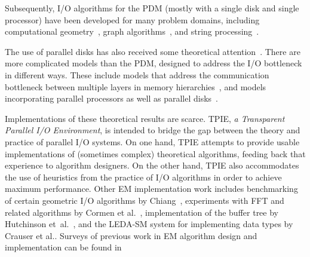 Subsequently, I/O algorithms for the PDM (mostly with a single disk
and single processor) have been developed for many problem domains,
including computational
geometry~\cite{aapv-fibld-01,goodrich:external,arge:buffer,arge:theory,arge:gis,aamvv-empgbtag97,arge:interval,kanellakis:indexing,ramaswamy:path,subramanian:p-range,vengroff:efficient,agarwal:efficient,zhu:further,agarwal:point,arge:scalable,arge:theory,callahan:topology,franciosa:orders,grossi:cross-tree,arge:tpie},
 graph
algorithms~\cite{chiang:external,arge:buffer,kumar:improved,abello:functional,crauser:randomized,arge:obdd,feuerstein:memory,nodine:blocking,ullman:input},
 and string
processing~\cite{ferragina:fully,ferragina:fast,arge:strings,crauser:construction}.

The use of parallel disks
 has also received some
theoretical
attention~\cite{vitter:parmem1,nodine:deterministic,nodine:greed,dehne:efficient,dehne:reducing}.
There are more complicated models than the PDM, designed to address
the I/O bottleneck in different ways. These include models that
address the communication bottleneck between multiple layers in memory
hierarchies~\cite{}, and models incorporating
parallel processors as well as parallel
disks~\cite{cormen:challenge,dehne:efficient,dehne:reducing}.

Implementations of these theoretical results are scarce. TPIE, \emph{a
  Transparent Parallel I/O Environment}, is intended to bridge the gap
between the theory and practice of parallel I/O systems. On one hand,
TPIE attempts to provide usable implementations of (sometimes complex)
theoretical algorithms, feeding back that experience to algorithm
designers. On the other hand, TPIE also accommodates the use of
heuristics from the practice of I/O algorithms in order to achieve
maximum performance. Other EM implementation work includes
benchmarking of certain geometric I/O algorithms by
Chiang~\cite{chiang:experiments}, experiments with FFT and related
algorithms by Cormen et al.~\cite{cormen:ffts}, implementation of the
buffer tree \cite{arge:buffer} by Hutchinson
et~al.~\cite{hutchinson:early}, and the LEDA-SM system for
implementing data types by Crauser et al.\cite{mehlhorn:ledasm}.
Surveys of previous work in EM algorithm design and implementation can
be found in~\cite{arge:gisbook,arge:thesis,vitter:dimacssurvey}


